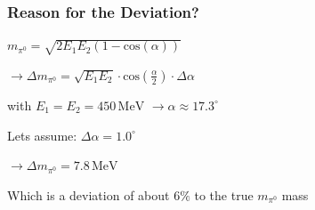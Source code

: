 \documentclass[slidestop,compress,mathserif]{beamer}
\begin{document}
\begin{frame}
	\frametitle{Reason for the Deviation?}
	\begin{center}
	
	$m_{\pi^0}=\sqrt{2 E_1E_2(1-\text{cos}(\alpha))}$
	
		$\rightarrow \Delta m_{\pi^0} =\sqrt{E_1 E_2} \cdot \text{cos}(\frac{\alpha}{2}) \cdot \Delta \alpha$
		\end{center} 
		
			\begin{center}
				
		with $E_1 = E_2 = 450\,\text{MeV}$ $\rightarrow \alpha \approx  17.3^{\circ}$
		
	\end{center}
			
	\begin{center}
					
		Lets assume: $\Delta \alpha = 1.0^{\circ} $
		
		$\rightarrow \Delta m_{\pi^0} = 7.8\,\text{MeV}$
		
		Which is a deviation of about $6\%$ to the true $m_{\pi^0}$ mass
		
	\end{center}

\end{frame}
\end{document}
